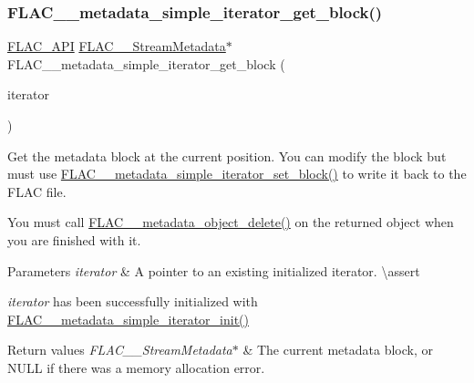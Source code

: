 \subsubsection{\texorpdfstring{FLAC\_\_metadata\_simple\_iterator\_get\_block()}{FLAC\_\_metadata\_simple\_iterator\_get\_block()}}
{\footnotesize\ttfamily \mbox{\hyperlink{group__flac__export_ga56ca07df8a23310707732b1c0007d6f5}{F\+L\+A\+C\+\_\+\+A\+PI}} \mbox{\hyperlink{struct_f_l_a_c_____stream_metadata}{F\+L\+A\+C\+\_\+\+\_\+\+Stream\+Metadata}}$\ast$ F\+L\+A\+C\+\_\+\+\_\+metadata\+\_\+simple\+\_\+iterator\+\_\+get\+\_\+block (\begin{DoxyParamCaption}\item[{\mbox{\hyperlink{group__flac__metadata__level1_ga6accccddbb867dfc2eece9ee3ffecb3a}{F\+L\+A\+C\+\_\+\+\_\+\+Metadata\+\_\+\+Simple\+Iterator}} $\ast$}]{iterator }\end{DoxyParamCaption})}

Get the metadata block at the current position. You can modify the block but must use \mbox{\hyperlink{group__flac__metadata__level1_ga7d1ceb2db292c968ae6ac18ecb15c356}{F\+L\+A\+C\+\_\+\+\_\+metadata\+\_\+simple\+\_\+iterator\+\_\+set\+\_\+block()}} to write it back to the F\+L\+AC file.

You must call \mbox{\hyperlink{group__flac__metadata__object_ga66bbe27dba68ba77be5af83986a280ea}{F\+L\+A\+C\+\_\+\+\_\+metadata\+\_\+object\+\_\+delete()}} on the returned object when you are finished with it.


\begin{DoxyParams}{Parameters}
{\em iterator} & A pointer to an existing initialized iterator. \textbackslash{}assert 
\begin{DoxyCode}{1}
\end{DoxyCode}
 {\itshape iterator} has been successfully initialized with \mbox{\hyperlink{group__flac__metadata__level1_ga2a055cca4e6e06ae62517c8b0fa6e8a3}{F\+L\+A\+C\+\_\+\+\_\+metadata\+\_\+simple\+\_\+iterator\+\_\+init()}} \\
\hline
\end{DoxyParams}

\begin{DoxyRetVals}{Return values}
{\em F\+L\+A\+C\+\_\+\+\_\+\+Stream\+Metadata$\ast$} & The current metadata block, or {\ttfamily N\+U\+LL} if there was a memory allocation error. \\
\hline
\end{DoxyRetVals}
\mbox{\label{group__flac__metadata__level1_gaad69b5d6c58c48e08dcfb3f1018c2602}} 
